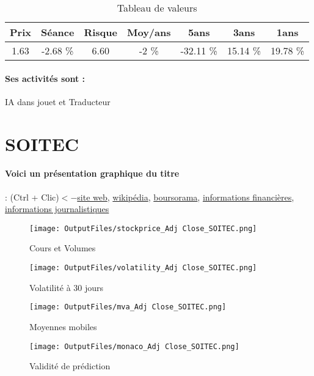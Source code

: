 \documentclass[11pt,a4paper]{report}%
\begin{document}
\begin{table}[H]
  \centering
    \begin{tabular}{|c|c|c|c|c|c|c|}
    \hline
    Prix & Séance & Risque  & Moy/ans & 5ans & 3ans & 1ans \\
    \hline
    1.63 &    -2.68 \%    & 6.60 & -2 \% & -32.11 \% & 15.14 \% & 19.78 \% \\
    \hline
    \end{tabular}%
        \label{tab:table_LEXIBOOK}%
      \caption{Tableau de valeurs}
\end{table}%

\paragraph{Ses activités sont : } IA dans jouet et Traducteur 
    
    \newpage

\section{SOITEC}

\paragraph{Voici un présentation graphique du titre} : (Ctrl + Clic)$<-$\href{https://www.soitec.com/fr}{site web}, \href{https://fr.wikipedia.org/wiki/Soitec}{wikipédia}, \href{https://www.boursorama.com/cours/1rPSOI}{boursorama}, \href{https://www.qwant.com/?q=site:https:%2f%2fwww.easybourse.com%2faction-societe%2fSOITEC&t=web&client=ext-firefox-hp}{informations financières}, \href{https://bourse.lerevenu.com/cours-de-bourse/fiche-valeur-synthese/SOITEC/SOI-FR}{informations journalistiques}
\begin{figure}[!htb]
   \begin{minipage}{0.5\textwidth}
     \centering
     \texttt{[image: OutputFiles/stockprice\_Adj Close\_SOITEC.png]}
     \caption{Cours et Volumes}\label{Fig:price_SOITEC}
   \end{minipage}\hfill
   \begin{minipage}{0.5\textwidth}
     \centering
     \texttt{[image: OutputFiles/volatility\_Adj Close\_SOITEC.png]}
     \caption{Volatilité à 30 jours}\label{Fig:volat_SOITEC}
   \end{minipage}
\end{figure}
\begin{figure}[!htb]
   \begin{minipage}{0.5\textwidth}
     \centering
     \texttt{[image: OutputFiles/mva\_Adj Close\_SOITEC.png]}
     \caption{Moyennes mobiles}\label{Fig:mva_SOITEC}
   \end{minipage}\hfill
   \begin{minipage}{0.5\textwidth}
     \centering
     \texttt{[image: OutputFiles/monaco\_Adj Close\_SOITEC.png]}
     \caption{Validité de prédiction}\label{Fig:prediction_SOITEC}
   \end{minipage}
\end{figure}
\end{document}
